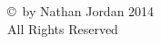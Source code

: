 \newpage

\thispagestyle{empty}
\setcounter{page}{0}

\hspace*{1in}

\vfill
\begin{center}
\copyright \ by Nathan Jordan 2014\\
All Rights Reserved
\end{center}

\hspace*{1in}
\vfill

